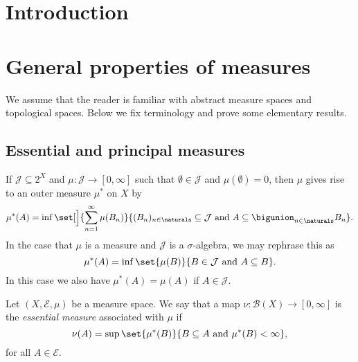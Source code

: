 \documentclass[article, a4paper, 11pt, oneside]{memoir}
\title{\doctitle}
\author{\docauthor}
\numberwithin{equation}{chapter}
\newcommand{\calB}{\mathcal{B}}
\newcommand{\calE}{\mathcal{E}}
\newcommand{\borel}[1]{\calB(#1)}
\begin{document}
\maketitle

\chapter{Introduction}


\chapter{General properties of measures}

We assume that the reader is familiar with abstract measure spaces and topological spaces. Below we fix terminology and prove some elementary results.


\section{Essential and principal measures}

\newcommand{\calJ}{\mathcal{J}}
\newcommand{\powerset}[1]{2^{#1}}

If $\calJ \subseteq \powerset{X}$ and $\mu \colon \calJ \to [0,\infty]$ such that $\emptyset \in \calJ$ and $\mu(\emptyset) = 0$, then $\mu$ gives rise to an outer measure $\mu^*$ on $X$ by
%
\begin{equation*}
    \mu^*(A)
        = \inf \set[\Big]{
            \sum_{n=1}^\infty \mu(B_n)
        }{
            (B_n)_{n \in \naturals} \subseteq \calJ
            \text{ and }
            A \subseteq \bigunion_{n \in \naturals} B_n
        }.
\end{equation*}
%
In the case that $\mu$ is a measure and $\calJ$ is a $\sigma$-algebra, we may rephrase this as
%
\begin{equation*}
    \mu^*(A)
        = \inf \set{
            \mu(B)
        }{
            B \in \calJ
            \text{ and }
            A \subseteq B
        }.
\end{equation*}
%
In this case we also have $\mu^*(A) = \mu(A)$ if $A \in \calJ$.

\begin{definition}
    Let $(X, \calE, \mu)$ be a measure space. We say that a map $\nu \colon \borel{X} \to [0,\infty]$ is the \emph{essential measure} associated with $\mu$ if
    \begin{equation}
        \label{eq:essential-measure-definition}
        \nu(A)
            = \sup \set{ \mu^*(B) }{ B \subseteq A \text{ and } \mu^*(B) < \infty },
    \end{equation}
    for all $A \in \calE$.
\end{definition}
\end{document}
